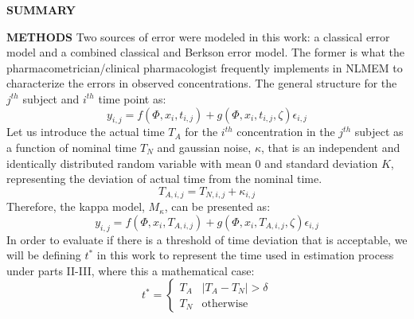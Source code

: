 \documentclass[final]{beamer}
\newlength{\colwidth}
\begin{document}
\begin{frame}[t]
\begin{columns}[t]
\begin{column}{\colwidth}
\begin{alertblock}{\textbf{SUMMARY}}
  \end{alertblock}
  \begin{block}{\textbf{METHODS}}
Two sources of error were modeled in this work: a classical error model and a combined classical and Berkson error model. The former is what the pharmacometrician/clinical pharmacologist frequently implements in NLMEM to characterize the errors in observed concentrations. The general structure for the $j^{th}$ subject and $i^{th}$ time point as:
\begin{equation}\label{eq:1}
y_{i,j} = f(\Phi, x_i, t_{i,j}) + g(\Phi, x_i, t_{i,j}, \zeta)\epsilon_{i,j}
\end{equation}  
Let us introduce the actual time $T_A$ for the $i^{th}$ concentration in the $j^{th}$ subject as a function of nominal time   $T_N$ and gaussian noise, $\kappa$, that is an independent and identically distributed random variable with mean 0 and standard deviation $K$, representing the deviation of actual time from the nominal time.
\begin{equation}\label{eq:two}
	T_{A,i,j} = T_{N,i,j} + \kappa_{i,j} 
\end{equation}
Therefore, the kappa model, $M_\kappa$, can be presented as:
\begin{equation}\label{eq:three}
y_{i,j} = f(\Phi, x_i, T_{A,i,j}) + g(\Phi, x_i, T_{A,i,j}, \zeta)\epsilon_{i,j}
\end{equation}  
In order to evaluate if there is a threshold of time deviation that is acceptable, we will be defining $t^*$ in this work to represent the time used in estimation process under parts II-III, where this a mathematical case:
\begin{equation}\label{eq:for}
t^* = \begin{cases} T_A & |T_A - T_N| > \delta \\ T_N & \mathrm{otherwise} \end{cases}
\end{equation} 


\end{block}
\end{column}
\end{columns}
\end{frame}
\end{document}
